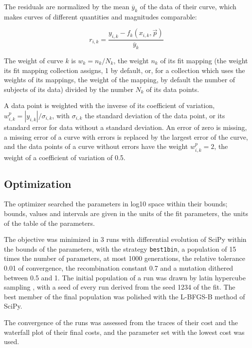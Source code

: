 The residuals are normalized by the mean $\overline{y}_k$ of the data of their curve, which makes curves of different quantities and magnitudes comparable:

\begin{equation}
r_{i,k} = \frac{y_{i,k} - f_k(x_{i,k}, \vec{p})}{\overline{y}_k}
\end{equation}

The weight of curve $k$ is $w_k = n_k / N_k$, the weight $n_k$ of its fit mapping (the weight its fit mapping collection assigns, 1 by default, or, for a collection which uses the weights of its mappings, the weight of the mapping, by default the number of subjects of its data) divided by the number $N_k$ of its data points.

A data point is weighted with the inverse of its coefficient of variation, $w^{p}_{i,k} = |y_{i,k}| / \sigma_{i,k}$, with $\sigma_{i,k}$ the standard deviation of the data point, or its standard error for data without a standard deviation. An error of zero is missing, a missing error of a curve with errors is replaced by the largest error of the curve, and the data points of a curve without errors have the weight $w^{p}_{i,k} = 2$, the weight of a coefficient of variation of 0.5.

\subsection{Optimization}

The optimizer searched the parameters in log10 space within their bounds; bounds, values and intervals are given in the units of the fit parameters, the units of the table of the parameters.

The objective was minimized in 3 runs with differential evolution \cite{Storn1997} of SciPy \cite{Virtanen2020} within the bounds of the parameters, with the strategy \texttt{best1bin}, a population of 15 times the number of parameters, at most 1000 generations, the relative tolerance 0.01 of convergence, the recombination constant 0.7 and a mutation dithered between 0.5 and 1. The initial population of a run was drawn by latin hypercube sampling \cite{McKay1979}, with a seed of every run derived from the seed 1234 of the fit. The best member of the final population was polished with the L-BFGS-B method of SciPy.

The convergence of the runs was assessed from the traces of their cost and the waterfall plot of their final costs, and the parameter set with the lowest cost was used.

